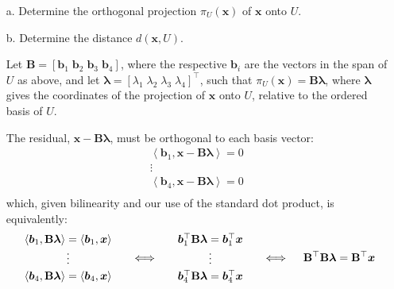\documentclass[11pt]{article}
\newcommand{\mat}[1]{\mathbf{#1}}   %
\newcommand{\vect}[1]{\bm{#1}}      %
\newcommand{\x}{\vect{x}}           %
\newcommand{\inner}[2]{\left\langle#1, #2\right\rangle}  %
\theoremstyle{definition}
\theoremstyle{plain}
\theoremstyle{remark}
\begin{document}
\begin{enumerate}
          \begin{enumerate}
              \item[a.] Determine the orthogonal projection $\pi_U(\x)$ of $\x$ onto $U$.
              \item[b.] Determine the distance $d(\x, U)$.

                    \vspace{1em}


                    Let $\mat{B} = [ \vect{b}_1 \; \vect{b}_2 \; \vect{b}_3 \; \vect{b}_4  ]$, where the respective
                    $\vect{b}_i$ are the vectors in the span of $U$ as above, and let $\bm{\lambda} = [ \lambda_1 \;
                        \lambda_2 \; \lambda_3 \; \lambda_4 ]^\top$, such that $\pi_U(\x) = \mat{B}\bm{\lambda}$, where
                    $\bm{\lambda}$ gives the coordinates of the projection of $\x$ onto $U$, relative to the ordered
                    basis of $U$.

                    The residual, $\x - \mat{B} \bm{\lambda}$, must be orthogonal to each basis vector:
                    \[
                        \begin{array}{c}
                            \inner{\vect{b}_1}{\x - \mat{B}\bm{\lambda}} = 0 \\ \vdots \\ [2pt]
                            \inner{\vect{b}_4}{\x - \mat{B}\bm{\lambda}} = 0 \\
                        \end{array}
                    \]
                    which, given bilinearity and our use of the standard dot product, is equivalently:
                    \[
                        \begin{array}{c}
                            \inner{\vect{b}_1}{\mat{B}\bm{\lambda}} = \inner{\vect{b}_1}{\x} \\ \vdots \\ [2pt]
                            \inner{\vect{b}_4}{\mat{B}\bm{\lambda}} = \inner{\vect{b}_4}{\x} \\
                        \end{array}
                        \quad
                        \iff
                        \quad
                        \begin{array}{c}
                            \vect{b}_1^\top \mat{B}\bm{\lambda}= \vect{b}_1^\top \x \\ \vdots \\ [2pt]
                            \vect{b}_4^\top \mat{B}\bm{\lambda}= \vect{b}_4^\top \x \\
                        \end{array}
                        \quad
                        \iff
                        \quad
                        \mat{B}^\top \mat{B} \bm{\lambda} = \mat{B}^\top \x \\ [2pt]
                    \]


\end{enumerate}
\end{enumerate}
\end{document}
